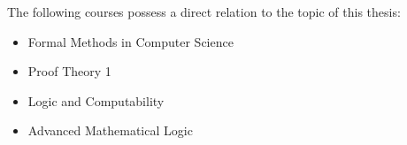 \documentclass[,%
			paper=a4,%
			DIV12,
			liststotoc,
			bibtotoc,
			draft=false,%
			numbers=noendperiod
			]{scrartcl}
\theoremstyle{definition}
\begin{document}
The following courses possess a direct relation to the topic of this thesis: 

\begin{itemize}
	\item Formal Methods in Computer Science
	\item Proof Theory 1 
	\item Logic and Computability 
	\item Advanced Mathematical Logic 
\end{itemize}


\nocite{*} %


\end{document}
